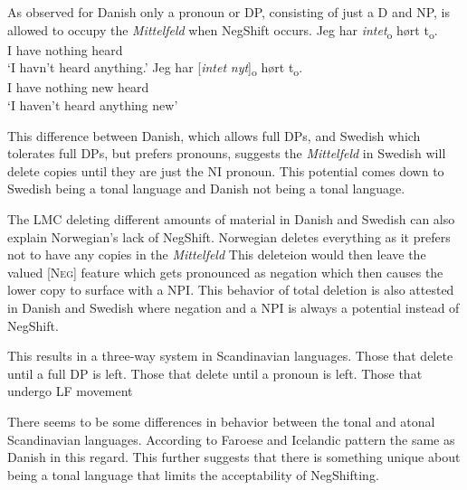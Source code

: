 \documentclass[12pt, letterpaper]{article}
\begin{document}
\ex As observed for Danish only a pronoun or DP, consisting of just a D and NP, is allowed to occupy the \emph{Mittelfeld} when NegShift occurs. 
	\ea 
	\gll Jeg har \textit{intet}\textsubscript{o} hørt t\textsubscript{o}.\\
	I have nothing heard\\
	\glt  `I havn't heard anything.'
	\ex 
	\gll Jeg har [\textit{intet} \textit{nyt}]\textsubscript{o} hørt t\textsubscript{o}.\\
	I have nothing new heard\\
	\glt `I haven't heard anything new'
	\z  	

\ex This difference between Danish, which allows full DPs, and Swedish which tolerates full DPs, but prefers pronouns, suggests the \emph{Mittelfeld} in Swedish will delete copies until they are just the NI pronoun. 
	\ea This potential comes down to Swedish being a tonal language and Danish not being a tonal language.
	\z 

\ex The LMC deleting different amounts of material in Danish and Swedish can also explain Norwegian's lack of NegShift. 
	\ea Norwegian deletes everything as it prefers not to have any copies in the \emph{Mittelfeld}
	\ex This deleteion would then leave the valued [\textsc{Neg}] feature which gets pronounced as negation which then causes the lower copy to surface with a NPI.  
	\ex This behavior of total deletion is also attested in Danish and Swedish where negation and a NPI is always a potential instead of NegShift.
	\z  

\ex This results in a three-way system in Scandinavian languages. 
	\ea Those that delete until a full DP is left.
	\ex Those that delete until a pronoun is left.
	\ex Those that undergo LF movement

\ex There seems to be some differences in behavior between the tonal and atonal Scandinavian languages. 
	\ea According to \citet{thrainssonFaroeseOverviewReference2004,thrainssonSyntaxIcelandic2010} Faroese and Icelandic pattern the same as Danish in this regard. 
	\ex This further suggests that there is something unique about being a tonal language that limits the acceptability of NegShifting. 
	\z 
\end{document}
